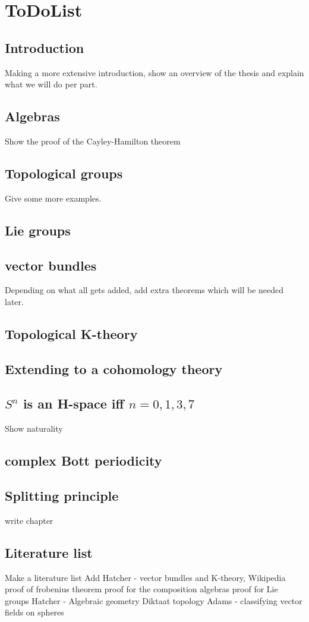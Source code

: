 \documentclass{report}
\begin{document}
\chapter{ToDoList}
\section{Introduction}
Making a more extensive introduction, show an overview of the thesis and explain what we will do per part.
\section{Algebras}
Show the proof of the Cayley-Hamilton theorem
\section{Topological groups}
Give some more examples.
\section{Lie groups}
\section{vector bundles}
Depending on what all gets added, add extra theorems which will be needed later.
\section{Topological K-theory}
\section{Extending to a cohomology theory}
\section{$S^n$ is an H-space iff $n = 0,1,3,7$}
Show naturality
\section{complex Bott periodicity}
\section{Splitting principle}
write chapter
\section{Literature list}
Make a literature list
Add Hatcher - vector bundles and K-theory,
Wikipedia proof of frobenius theorem
proof for the composition algebras
proof for Lie groups
Hatcher - Algebraic geometry
Diktaat topology
Adams - classifying vector fields on spheres
\end{document}
